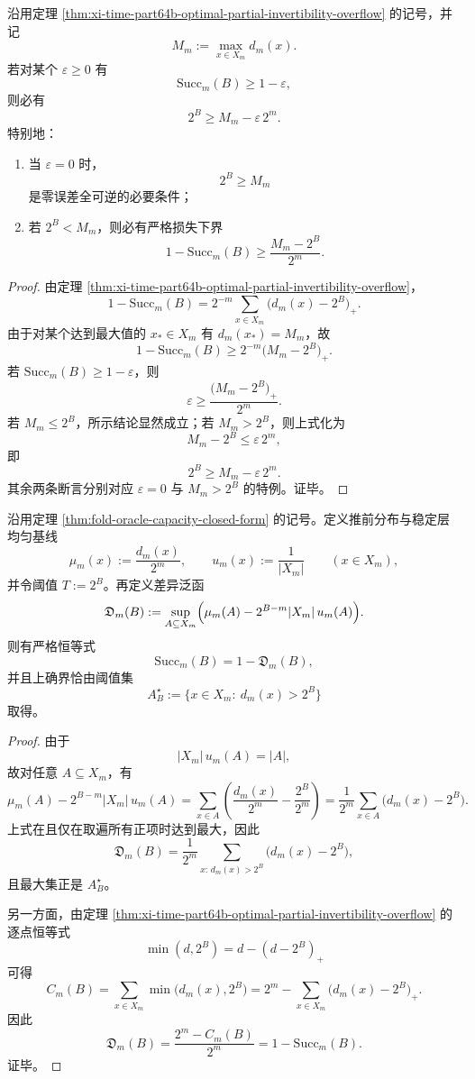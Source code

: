 \begin{corollary}[近完美读出的尖锐必要条件]\label{cor:xi-time-part64b-near-perfect-readout-sharp-necessary-condition}
沿用定理 \ref{thm:xi-time-part64b-optimal-partial-invertibility-overflow} 的记号，并记
\[
M_m:=\max_{x\in X_m}d_m(x).
\]
若对某个 \(\varepsilon\ge 0\) 有
\[
\mathrm{Succ}_m(B)\ge 1-\varepsilon,
\]
则必有
\[
\boxed{\;
2^B\ge M_m-\varepsilon\,2^m.\;}
\]
特别地：
\begin{enumerate}
  \item 当 \(\varepsilon=0\) 时，
  \[
  2^B\ge M_m
  \]
  是零误差全可逆的必要条件；
  \item 若 \(2^B<M_m\)，则必有严格损失下界
  \[
  \boxed{\;
  1-\mathrm{Succ}_m(B)\ge \frac{M_m-2^B}{2^m}.\;}
  \]
\end{enumerate}
\end{corollary}
\begin{proof}
由定理 \ref{thm:xi-time-part64b-optimal-partial-invertibility-overflow}，
\[
1-\mathrm{Succ}_m(B)
=
2^{-m}\sum_{x\in X_m}\bigl(d_m(x)-2^B\bigr)_+.
\]
由于对某个达到最大值的 \(x_\ast\in X_m\) 有 \(d_m(x_\ast)=M_m\)，故
\[
1-\mathrm{Succ}_m(B)
\ge
2^{-m}\bigl(M_m-2^B\bigr)_+.
\]
若 \(\mathrm{Succ}_m(B)\ge 1-\varepsilon\)，则
\[
\varepsilon\ge \frac{\bigl(M_m-2^B\bigr)_+}{2^m}.
\]
若 \(M_m\le 2^B\)，所示结论显然成立；若 \(M_m>2^B\)，则上式化为
\[
M_m-2^B\le \varepsilon\,2^m,
\]
即
\[
2^B\ge M_m-\varepsilon\,2^m.
\]
其余两条断言分别对应 \(\varepsilon=0\) 与 \(M_m>2^B\) 的特例。证毕。
\end{proof}

\begin{theorem}\label{thm:xi-time-part64b-oracle-capacity-neyman-pearson-duality}
沿用定理 \ref{thm:fold-oracle-capacity-closed-form} 的记号。定义推前分布与稳定层均匀基线
\[
\mu_m(x):=\frac{d_m(x)}{2^m},
\qquad
u_m(x):=\frac{1}{|X_m|}
\qquad (x\in X_m),
\]
并令阈值 \(T:=2^B\)。再定义差异泛函
\[
\mathfrak D_m(B):=
\sup_{A\subseteq X_m}
\Bigl(
\mu_m(A)-2^{B-m}|X_m|\,u_m(A)
\Bigr).
\]
则有严格恒等式
\[
\mathrm{Succ}_m(B)=1-\mathfrak D_m(B),
\]
并且上确界恰由阈值集
\[
A_B^\star:=\{x\in X_m:\ d_m(x)>2^B\}
\]
取得。
\end{theorem}
\begin{proof}
由于
\[
|X_m|\,u_m(A)=|A|,
\]
故对任意 \(A\subseteq X_m\)，有
\[
\mu_m(A)-2^{B-m}|X_m|\,u_m(A)
=
\sum_{x\in A}\left(\frac{d_m(x)}{2^m}-\frac{2^B}{2^m}\right)
=
\frac{1}{2^m}\sum_{x\in A}\bigl(d_m(x)-2^B\bigr).
\]
上式在且仅在取遍所有正项时达到最大，因此
\[
\mathfrak D_m(B)
=
\frac{1}{2^m}
\sum_{x:\,d_m(x)>2^B}\bigl(d_m(x)-2^B\bigr),
\]
且最大集正是 \(A_B^\star\)。

另一方面，由定理 \ref{thm:xi-time-part64b-optimal-partial-invertibility-overflow} 的逐点恒等式
\[
\min(d,2^B)=d-(d-2^B)_+
\]
可得
\[
C_m(B)
=
\sum_{x\in X_m}\min\bigl(d_m(x),2^B\bigr)
=
2^m-\sum_{x\in X_m}\bigl(d_m(x)-2^B\bigr)_+.
\]
因此
\[
\mathfrak D_m(B)
=
\frac{2^m-C_m(B)}{2^m}
=
1-\mathrm{Succ}_m(B).
\]
证毕。
\end{proof}

